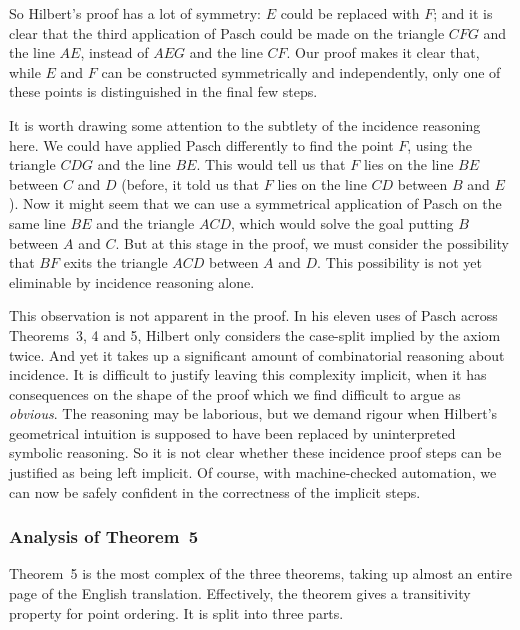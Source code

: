 So Hilbert's proof has a lot of symmetry: $E$ could be replaced with $F$; and it is clear that the third application of Pasch could be made on the triangle $CFG$ and the line $AE$, instead of $AEG$ and the line $CF$. Our proof makes it clear that, while $E$ and $F$ can be constructed symmetrically and independently, only one of these points is distinguished in the final few steps. 

It is worth drawing some attention to the subtlety of the incidence reasoning here. We could have applied Pasch differently to find the point $F$, using the triangle $CDG$ and the line $BE$. This would tell us that $F$ lies on the line $BE$ between $C$ and $D$ (before, it told us that $F$ lies on the line $CD$ between $B$ and $E$). Now it might seem that we can use a symmetrical application of Pasch on the same line $BE$ and the triangle $ACD$, which would solve the goal putting $B$ between $A$ and $C$. But at this stage in the proof, we must consider the possibility that $BF$ exits the triangle $ACD$ between $A$ and $D$. This possibility is not yet eliminable by incidence reasoning alone.

This observation is not apparent in the proof. In his eleven uses of Pasch across Theorems~3, 4 and 5, Hilbert only considers the case-split implied by the axiom twice. And yet it takes up a significant amount of combinatorial reasoning about incidence. It is difficult to justify leaving this complexity implicit, when it has consequences on the shape of the proof which we find difficult to argue as \emph{obvious}. The reasoning may be laborious, but we demand rigour when Hilbert's geometrical intuition is supposed to have been replaced by uninterpreted symbolic reasoning. So it is not clear whether these incidence proof steps can be justified as being left implicit. Of course, with machine-checked automation, we can now be safely confident in the correctness of the implicit steps.

\subsubsection{Analysis of Theorem~5}\label{sec:Theorem5}
Theorem~5 is the most complex of the three theorems, taking up almost an entire page of the English translation. Effectively, the theorem gives a transitivity property for point ordering. It is split into three parts. 


